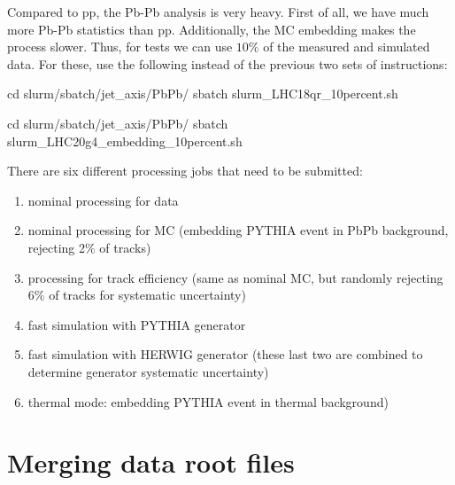 \documentclass[12pt]{article}
\begin{document}
Compared to pp, the Pb-Pb analysis is very heavy. First of all, we have much more Pb-Pb statistics than pp. Additionally,
the MC embedding makes the process slower. Thus, for tests we can use $10\%$ of the measured and simulated data.
For these, use the following instead of the previous two sets of instructions:

\begin{tcolorbox}
\begin{verbnobox}[\scriptsize]
cd slurm/sbatch/jet_axis/PbPb/
sbatch slurm_LHC18qr_10percent.sh
\end{verbnobox}  
\end{tcolorbox}

\begin{tcolorbox}
\begin{verbnobox}[\scriptsize]
cd slurm/sbatch/jet_axis/PbPb/
sbatch slurm_LHC20g4_embedding_10percent.sh
\end{verbnobox}  
\end{tcolorbox}

There are six different processing jobs that need to be submitted:
\begin{enumerate}
\item nominal processing for data
\item nominal processing for MC (embedding PYTHIA event in PbPb background, rejecting 2$\%$ of tracks)
\item processing for track efficiency (same as nominal MC, but randomly rejecting 6$\%$ of tracks for systematic uncertainty)
\item fast simulation with PYTHIA generator
\item fast simulation with HERWIG generator (these last two are combined to determine generator systematic uncertainty)
\item thermal mode: embedding PYTHIA event in thermal background)
\end{enumerate}

\section{Merging data root files}
\end{document}
